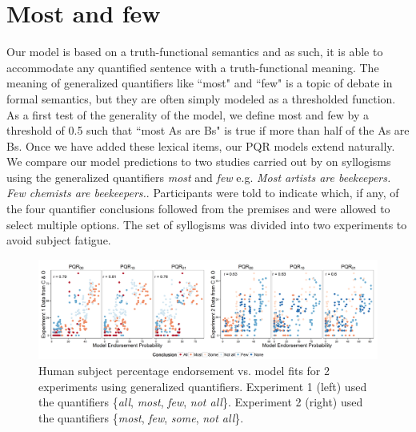 \documentclass[10pt,letterpaper]{article}
\begin{document}





\section{Most and few}

Our model is based on a truth-functional semantics and as such, it is able to accommodate any quantified sentence with a truth-functional meaning. The meaning of generalized quantifiers like ``most" and ``few" is a topic of debate in formal semantics, but they are often simply modeled as a thresholded function. As a first test of the generality of the model, we define most and few by a threshold of 0.5 such that ``most As are Bs" is true if more than half of the As are Bs. Once we have added these lexical items, our PQR models extend naturally. 
%
We compare our model predictions to two studies carried out by  on syllogisms using the generalized quantifiers \emph{most} and \emph{few} e.g. \emph{Most artists are beekeepers. Few chemists are beekeepers.}. Participants were told to indicate which, if any, of the four quantifier conclusions followed from the premises and were allowed to select multiple options.
%
The set of syllogisms was divided into two experiments to avoid subject fatigue.

\begin{figure}[t]
	\centering
  \includegraphics[width=\textwidth]{fig3_multiScatter_colorset_AMFO_MFIE_n6_alpha2}
      \caption{Human subject percentage endorsement vs. model fits for 2 experiments using generalized quantifiers. Experiment 1 (left) used the quantifiers \{\emph{all}, \emph{most}, \emph{few}, \emph{not all}\}. Experiment 2 (right) used the quantifiers \{\emph{most}, \emph{few}, \emph{some}, \emph{not all}\}.}
  \label{fig:mfScatter}
\end{figure}
\end{document}
